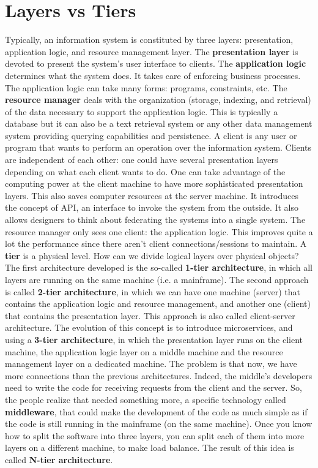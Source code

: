 \section{Layers vs Tiers}
Typically, an information system is constituted by three layers: presentation, application logic, and resource management layer.
The \textbf{presentation layer} is devoted to present the system's user interface to clients.
The \textbf{application logic} determines what the system does.
It takes care of enforcing business processes.
The application logic can take many forms: programs, constraints, etc. The \textbf{resource manager} deals with the organization (storage, indexing, and retrieval) of the data necessary to support the application logic.
This is typically a database but it can also be a text retrieval system or any other data management system providing querying capabilities and persistence.
A client is any user or program that wants to perform an operation over the information system.
Clients are independent of each other: one could have several presentation layers depending on what each client wants to do. One can take advantage of the computing power at the client machine to have more sophisticated presentation layers.
This also saves computer resources at the server machine.
It introduces the concept of API, an interface to invoke the system from the outside.
It also allows designers to think about federating the systems into a single system.
The resource manager only sees one client: the application logic.
This improves quite a lot the performance since there aren't client connections/sessions to maintain.
A \textbf{tier} is a physical level.
How can we divide logical layers over physical objects?
The first architecture developed is the so-called \textbf{1-tier architecture}, in which all layers are running on the same machine (i.e. a mainframe).
The second approach is called \textbf{2-tier architecture}, in which we can have one machine (server) that contains the application logic and resource management, and another one (client) that contains the presentation layer.
This approach is also called client-server architecture.
The evolution of this concept is to introduce microservices, and using a \textbf{3-tier architecture}, in which the presentation layer runs on the client machine, the application logic layer on a middle machine and the resource management layer on a dedicated machine.
The problem is that now, we have more connections than the previous architectures.
Indeed, the middle's developers need to write the code for receiving requests from the client and the server.
So, the people realize that needed something more, a specific technology called \textbf{middleware}, that could make the development of the code as much simple as if the code is still running in the mainframe (on the same machine).
Once you know how to split the software into three layers, you can split each of them into more layers on a different machine, to make load balance.
The result of this idea is called \textbf{N-tier architecture}.

